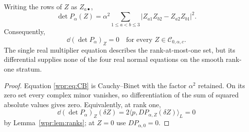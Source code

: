 \begin{lemma}
\label{wpr:lem:irregular}
Writing the rows of \(Z\) as \(Z_{a\bullet}\),
\begin{equation}
 \det P_\alpha(Z)=
 \alpha^2\sum_{1\leq a<b\leq3}
 |Z_{a1}Z_{b2}-Z_{a2}Z_{b1}|^2.
 \label{wpr:eq:CB}
\end{equation}
Consequently,
\[
 \dd(\det P_\alpha)_Z=0
 \quad\text{for every }Z\in\mathcal C_{0,\alpha,c}.
\]
The single real multiplier equation describes the rank-at-most-one
set, but its differential supplies none of the four real normal
equations on the smooth rank-one stratum.
\end{lemma}
\begin{proof}
Equation \eqref{wpr:eq:CB} is Cauchy--Binet with the factor
\(\alpha^2\) retained.  On its zero set every complex minor vanishes,
so differentiation of the sum of squared absolute values gives zero.
Equivalently, at rank one,
\[
 \dd(\det P_\alpha)_Z(\delta Z)
 =2\langle p,D P_{\alpha,Z}(\delta Z)\rangle_L=0
\]
by Lemma~\ref{wpr:lem:ranks}; at \(Z=0\) use
\(D P_{\alpha,0}=0\).
\end{proof}

